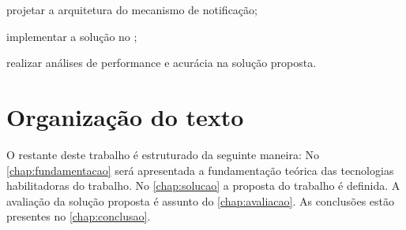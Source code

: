 \begin{alineas}

	\item projetar a arquitetura do mecanismo de notificação;

	\item implementar a solução no \middleware \mhubcddl;

	\item realizar análises de performance e acurácia na solução proposta.

\end{alineas}


\section{Organização do texto}

O restante deste trabalho é estruturado da seguinte maneira: No \autoref{chap:fundamentacao} será apresentada a fundamentação teórica das tecnologias habilitadoras do trabalho. No \autoref{chap:solucao} a proposta do trabalho é definida. A avaliação da solução proposta é assunto do \autoref{chap:avaliacao}. As conclusões estão presentes no \autoref{chap:conclusao}.

